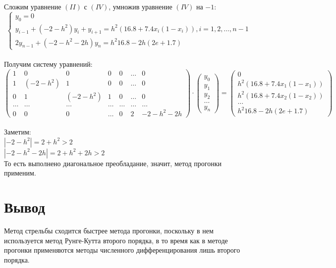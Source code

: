 \documentclass[12pt,a4paper]{article}
\begin{document}
		Сложим уравнение $(II)$ с $(IV)$, умножив уравнение $(IV)$ на $-1$:\\
		\[
		\begin{cases}
			y_{0} = 0\\
			y_{i-1} + (-2 - h^{2})y_{i} + y_{i+1} = h^{2}(16.8 + 7.4x_{i}(1 - x_{i})), i = 1, 2, \dotsc, n-1\\
			2y_{n-1} + (-2 - h^{2} - 2h)y_{n} = h^{2}16.8 - 2h(2e + 1.7)
		\end{cases}
		\]\\
		Получим систему уравнений:\\
		\[ \left( \begin{array}{ccccccc}
		1 & 0 & 0 & 0 & 0 & \dots & 0 \\
		1 & (-2-h^{2}) & 1 & 0 & 0 & \dots & 0 \\
		0 & 1 & (-2-h^{2}) & 1 & 0 & \dots & 0 \\
		\dots & \dots & \dots & \dots & \dots & \dots & \dots \\
		0 & 0 & 0 & \dots & 0 & 2 & -2-h^{2}-2h \end{array} \right)
		\cdot
		\left( \begin{array}{c}
		y_{0} \\
		y_{1} \\
		y_{2} \\
		\dots \\
		y_{n} \end{array} \right)
		=
		\left( \begin{array}{c}
		0 \\
		h^2(16.8 + 7.4x_{1}(1 - x_{1})) \\
		h^2(16.8 + 7.4x_{2}(1 - x_{2})) \\
		\dots \\
		h^{2}16.8 - 2h(2e + 1.7) \end{array} \right)
		\]\\
		Заметим:\\
		$|-2 - h^{2}| = 2 + h^{2} > 2$\\
		$|-2 - h^2 - 2h| = 2 + h^{2} + 2h > 2$\\
		То есть выполнено диагональное преобладание, значит, метод прогонки применим.
		
	\newpage
	\section*{Вывод}
		Метод стрельбы сходится быстрее метода прогонки, поскольку в нем используется
		метод Рунге-Кутта второго порядка, в то время как в методе прогонки применяются
		методы численного дифференцирования лишь второго порядка.
\end{document}
